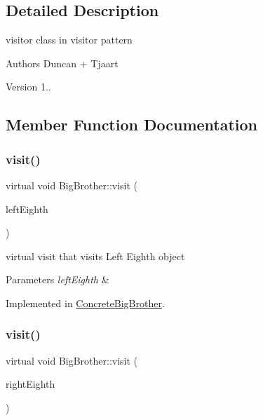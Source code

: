 \subsection{Detailed Description}
visitor class in visitor pattern 

\begin{DoxyAuthor}{Authors}
Duncan + Tjaart 
\end{DoxyAuthor}
\begin{DoxyVersion}{Version}
1.. 
\end{DoxyVersion}


\subsection{Member Function Documentation}
\mbox{\label{class_big_brother_a2fabe9f19796ca5b9882ed3d8c8901d0}} 
\subsubsection{\texorpdfstring{visit()}{visit()}\hspace{0.1cm}{\footnotesize\ttfamily [1/7]}}
{\footnotesize\ttfamily virtual void Big\+Brother\+::visit (\begin{DoxyParamCaption}\item[{\mbox{\hyperlink{class_left_eighth}{Left\+Eighth}} $\ast$}]{left\+Eighth }\end{DoxyParamCaption})\hspace{0.3cm}{\ttfamily [pure virtual]}}

virtual visit that visits Left Eighth object 
\begin{DoxyParams}{Parameters}
{\em left\+Eighth} & \\
\hline
\end{DoxyParams}


Implemented in \mbox{\hyperlink{class_concrete_big_brother_a9c9e11e8ed4b7a2c0c33850f481f4402}{Concrete\+Big\+Brother}}.

\mbox{\label{class_big_brother_a99a50a1db4244d77dd3dcaa9fdbd7946}} 
\subsubsection{\texorpdfstring{visit()}{visit()}\hspace{0.1cm}{\footnotesize\ttfamily [2/7]}}
{\footnotesize\ttfamily virtual void Big\+Brother\+::visit (\begin{DoxyParamCaption}\item[{\mbox{\hyperlink{class_right_eighth}{Right\+Eighth}} $\ast$}]{right\+Eighth }\end{DoxyParamCaption})\hspace{0.3cm}{\ttfamily [pure virtual]}}

